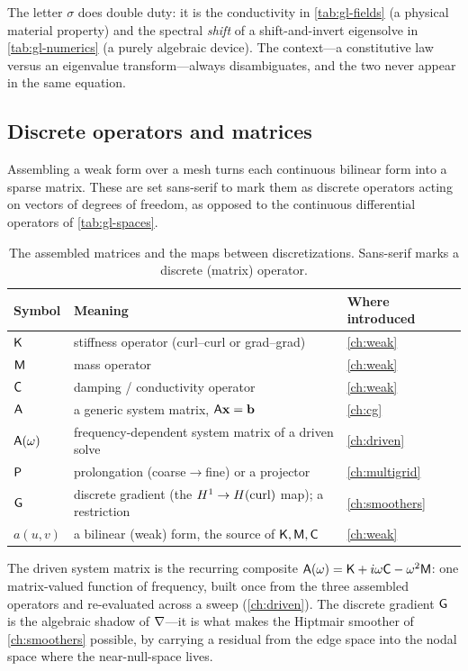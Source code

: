 \begin{notationbox}
The letter $\sigma$ does double duty: it is the conductivity in
\cref{tab:gl-fields} (a physical material property) and the spectral
\emph{shift} of a shift-and-invert eigensolve in \cref{tab:gl-numerics} (a purely
algebraic device). The context---a constitutive law versus an eigenvalue
transform---always disambiguates, and the two never appear in the same equation.
\end{notationbox}

\subsection{Discrete operators and matrices}

Assembling a weak form over a mesh turns each continuous bilinear form into a
sparse matrix. These are set sans-serif to mark them as discrete operators acting
on vectors of degrees of freedom, as opposed to the continuous differential
operators of \cref{tab:gl-spaces}.

\begin{table}[ht]
\centering
\small
\caption[Discrete operators]{The assembled matrices and the maps between
discretizations. Sans-serif marks a discrete (matrix) operator.}
\label{tab:gl-operators}
\begin{tabular}{@{}lll@{}}
\toprule
Symbol & Meaning & Where introduced \\
\midrule
$\mathsf{K}$ & stiffness operator (curl--curl or grad--grad) & \cref{ch:weak} \\
$\mathsf{M}$ & mass operator & \cref{ch:weak} \\
$\mathsf{C}$ & damping / conductivity operator & \cref{ch:weak} \\
$\mathsf{A}$ & a generic system matrix, $\mathsf{A}\mathbf{x}=\mathbf{b}$ & \cref{ch:cg} \\
$\mathsf{A}(\omega)$ & frequency-dependent system matrix of a driven solve & \cref{ch:driven} \\
$\mathsf{P}$ & prolongation (coarse$\to$fine) or a projector & \cref{ch:multigrid} \\
$\mathsf{G}$ & discrete gradient (the $H^1\to H(\mathrm{curl})$ map); a restriction & \cref{ch:smoothers} \\
$a(u,v)$ & a bilinear (weak) form, the source of $\mathsf{K},\mathsf{M},\mathsf{C}$ & \cref{ch:weak} \\
\bottomrule
\end{tabular}
\end{table}

The driven system matrix is the recurring composite
$\mathsf{A}(\omega)=\mathsf{K}+i\omega\mathsf{C}-\omega^2\mathsf{M}$: one matrix-valued
function of frequency, built once from the three assembled operators and
re-evaluated across a sweep (\cref{ch:driven}). The discrete gradient $\mathsf{G}$
is the algebraic shadow of $\nabla$---it is what makes the Hiptmair smoother of
\cref{ch:smoothers} possible, by carrying a residual from the edge space into the
nodal space where the near-null-space lives.

